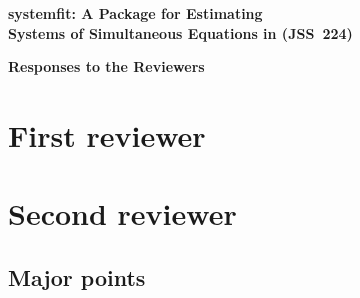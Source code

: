 \documentclass[12pt,english]{scrartcl}
\begin{document}
\begin{center}
{\Large\textbf{\textsf{
systemfit: A Package for Estimating\\[0.3em]
Systems of Simultaneous Equations in  (JSS~224)
}}}

\bigskip

{\Large\textbf{\textsf{Responses to the Reviewers}}}
\end{center}


\section{First reviewer}





\section{Second reviewer}




\subsection{Major points}
\end{document}
